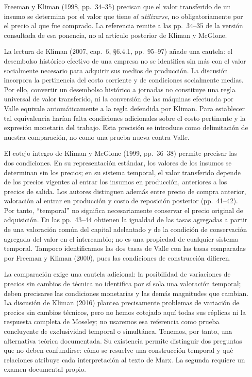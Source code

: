 \documentclass[10pt,twoside]{article}
\begin{document}
Freeman y Kliman (1998, pp.~34--35) precisan que el valor transferido de un insumo se determina por el valor que tiene \emph{al utilizarse}, no obligatoriamente por el precio al que fue comprado. La referencia remite a las pp.~34--35 de la versión consultada de esa ponencia, no al artículo posterior de Kliman y McGlone.

La lectura de Kliman (2007, cap.~6, \S 6.4.1, pp.~95--97) añade una cautela: el desembolso histórico efectivo de una empresa no se identifica sin más con el valor socialmente necesario para adquirir sus medios de producción. La discusión incorpora la pertinencia del costo corriente y de condiciones socialmente medias. Por ello, convertir un desembolso histórico a jornadas no constituye una regla universal de valor transferido, ni la conversión de las máquinas efectuada por Valle equivale automáticamente a la regla defendida por Kliman. Para establecer tal equivalencia harían falta condiciones adicionales sobre el costo pertinente y la expresión monetaria del trabajo. Esta precisión se introduce como delimitación de nuestra comparación, no como una prueba nueva contra Valle.

El cotejo íntegro de Kliman y McGlone (1999, pp.~36--38) permite precisar las dos condiciones. En su representación estándar, los valores de los insumos se determinan sin los precios; en su sistema temporal, el valor transferido depende de los precios vigentes al entrar los insumos en producción, anteriores a los precios de salida. Los autores distinguen además entre precio de compra anterior, valoración al entrar en producción y costo de reposición posterior (pp.~41--42). Por tanto, ``temporal'' no significa necesariamente conservar el precio original de adquisición. En las pp.~43--44 obtienen la igualdad de las tasas agregadas a partir de una valoración común del capital adelantado y de la condición de conservación agregada del valor en el intercambio; no es una propiedad de cualquier sistema temporal. Tampoco identificamos las dos tasas de Valle con las tasas comparadas por Freeman y Kliman (2000), pues las condiciones de construcción difieren.

La comparación exige una cautela adicional: la posibilidad de variaciones de precios sin cambios de técnica no identifica por sí sola una valoración temporal; deben precisarse las condiciones monetarias y las demás magnitudes que cambian. La discusión de Kliman (2016) plantea precisamente problemas de variación de precios sin cambios técnicos, pero no hemos cotejado aquí todas sus réplicas ni la respuesta completa de Moseley; no usaremos esa referencia como prueba concluyente de exclusividad temporal o simultánea. Tenemos, por tanto, una alternativa teórica documentada. Su existencia permite distinguir dos preguntas que no deben confundirse: cómo se resuelve una construcción temporal y qué relaciones atribuye cada interpretación al texto de Marx. La segunda requiere un examen documental propio.
\end{document}
